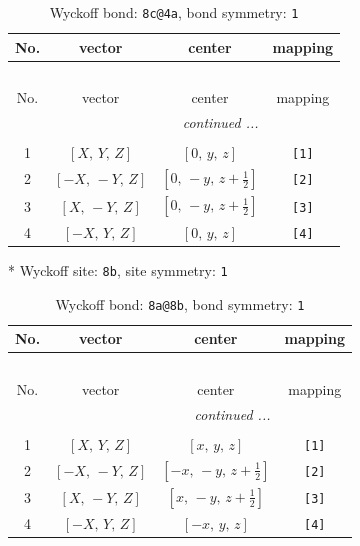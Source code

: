 \documentclass[fleqn,8pt]{jsarticle}
\begin{document}
\renewcommand{\arraystretch}{1.2}
\begin{longtable}{cccc}
\caption{Wyckoff bond: {\tt 8c@4a}, bond symmetry: {\tt 1}}
 \\
 \hline \hline
No. & vector & center & mapping \\ \hline \endfirsthead

\multicolumn{3}{l}{\tablename\ \thetable{}} \\
 \hline \hline
No. & vector & center & mapping \\ \hline \endhead

 \hline \hline
\multicolumn{3}{r}{\footnotesize\it continued ...} \\ \endfoot

 \hline \hline
\multicolumn{3}{r}{} \\ \endlastfoot

1 & $\left[ X,\, Y,\, Z \right]$ & $\left[ 0,\, y,\, z \right]$ & {\tt [1]} \\ \hline
2 & $\left[ - X,\, - Y,\, Z \right]$ & $\left[ 0,\, - y,\, z + \frac{1}{2} \right]$ & {\tt [2]} \\ \hline
3 & $\left[ X,\, - Y,\, Z \right]$ & $\left[ 0,\, - y,\, z + \frac{1}{2} \right]$ & {\tt [3]} \\ \hline
4 & $\left[ - X,\, Y,\, Z \right]$ & $\left[ 0,\, y,\, z \right]$ & {\tt [4]} \\
\end{longtable}
* Wyckoff site: {\tt 8b}, site symmetry: {\tt 1}
\renewcommand{\arraystretch}{1.2}
\begin{longtable}{cccc}
\caption{Wyckoff bond: {\tt 8a@8b}, bond symmetry: {\tt 1}}
 \\
 \hline \hline
No. & vector & center & mapping \\ \hline \endfirsthead

\multicolumn{3}{l}{\tablename\ \thetable{}} \\
 \hline \hline
No. & vector & center & mapping \\ \hline \endhead

 \hline \hline
\multicolumn{3}{r}{\footnotesize\it continued ...} \\ \endfoot

 \hline \hline
\multicolumn{3}{r}{} \\ \endlastfoot

1 & $\left[ X,\, Y,\, Z \right]$ & $\left[ x,\, y,\, z \right]$ & {\tt [1]} \\ \hline
2 & $\left[ - X,\, - Y,\, Z \right]$ & $\left[ - x,\, - y,\, z + \frac{1}{2} \right]$ & {\tt [2]} \\ \hline
3 & $\left[ X,\, - Y,\, Z \right]$ & $\left[ x,\, - y,\, z + \frac{1}{2} \right]$ & {\tt [3]} \\ \hline
4 & $\left[ - X,\, Y,\, Z \right]$ & $\left[ - x,\, y,\, z \right]$ & {\tt [4]} \\
\end{longtable}
\end{document}

